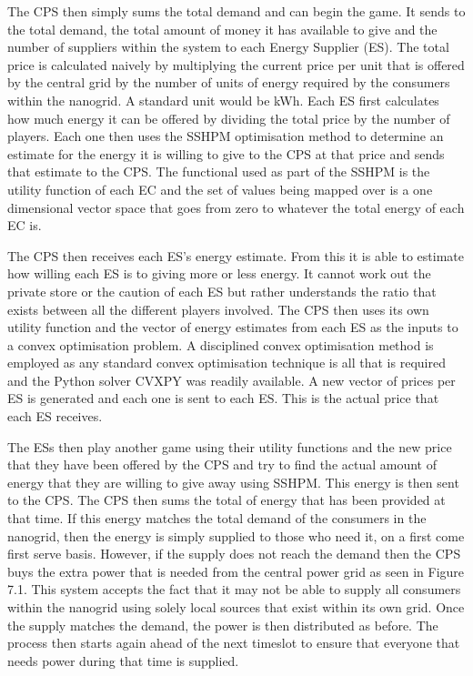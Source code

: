 \documentclass[a4paper, notitlepage]{report}
\begin{document}
The CPS then simply sums the total demand and can begin the game. It sends to
the total demand, the total amount of money it has available to give and the
number of suppliers within the system to each Energy Supplier (ES). The total
price is calculated naively by multiplying the current price per unit that is
offered by the central grid by the number of units of energy required by the
consumers within the nanogrid. A standard unit would be kWh. Each ES first
calculates how much energy it can be offered by dividing the total price by the
number of players. Each one then uses the SSHPM optimisation method to determine
an estimate for the energy it is willing to give to the CPS at that price and
sends that estimate to the CPS. The functional used as part of the SSHPM is the
utility function of each EC and the set of values being mapped over is a one
dimensional vector space that goes from zero to whatever the total energy of
each EC is.

The CPS then receives each ES's energy estimate. From this it is able to
estimate how willing each ES is to giving more or less energy. It cannot work
out the private store or the caution of each ES but rather understands the ratio
that exists between all the different players involved. The CPS then uses its
own utility function and the vector of energy estimates from each ES as the
inputs to a convex optimisation problem. A disciplined convex optimisation
method is employed \cite{grant2006disciplined} as any standard convex optimisation 
technique is all that is required and the Python solver CVXPY \cite{diamond2016cvxpy} was readily
available. A new vector of prices per ES is generated and each one is sent to
each ES. This is the actual price that each ES receives.

The ESs then play another game using their utility functions and the new price
that they have been offered by the CPS and try to find the actual amount of
energy that they are willing to give away using SSHPM. This energy is then sent
to the CPS. The CPS then sums the total of energy that has been provided at that
time. If this energy matches the total demand of the consumers in the nanogrid,
then the energy is simply supplied to those who need it, on a first come first
serve basis. However, if the supply does not reach the demand then the CPS buys
the extra power that is needed from the central power grid as seen in Figure
7.1. This system accepts the fact that it may not be able to supply all
consumers within the nanogrid using solely local sources that exist within its
own grid. Once the supply matches the demand, the power is then distributed as
before. The process then starts again ahead of the next timeslot to ensure that
everyone that needs power during that time is supplied.
\end{document}
